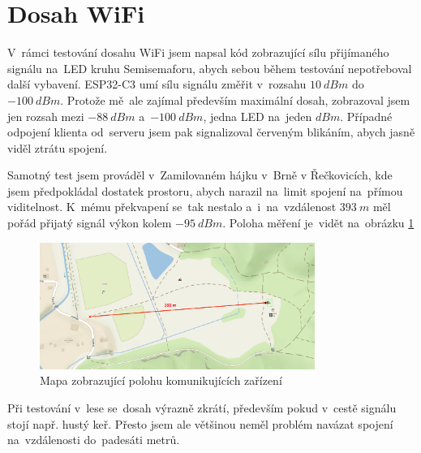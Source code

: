 \newpage
\section{Dosah WiFi}
V~rámci testování dosahu WiFi jsem napsal kód zobrazující sílu přijímaného signálu na~LED kruhu Semisemaforu, abych sebou během testování nepotřeboval další vybavení.
ESP32-C3 umí sílu signálu změřit v~rozsahu \(10~dBm\) do~\(-100~dBm\).
Protože mě~ale zajímal především maximální dosah, zobrazoval jsem jen rozsah mezi \(-88~dBm\) a~\(-100~dBm\), jedna LED na~jeden \(dBm\).
Případné odpojení klienta od~serveru jsem pak signalizoval červeným blikáním, abych jasně viděl ztrátu spojení.

Samotný test jsem prováděl v~Zamilovaném hájku v~Brně v Řečkovicích, kde jsem předpokládal dostatek prostoru, abych narazil na~limit spojení na~přímou viditelnost.
K~mému překvapení se~tak nestalo a~i~na~vzdálenost \(393~m\) měl pořád přijatý signál výkon kolem \(-95~dBm\).
Poloha měření je~vidět na~obrázku \ref{Semisemafor-dosah-zamilec}

\begin{figure}[!h]
  \centering
  \includegraphics[width=0.8\textwidth]{text/PraktickaCast/img/mapa-zamilec-semafor.png}
  \caption{Mapa zobrazující polohu komunikujících zařízení \cite{MereniDosahuSemaforu-zamilec}}
  \label{Semisemafor-dosah-zamilec}
\end{figure}

Při testování v~lese se~dosah výrazně zkrátí, především pokud v~cestě signálu stojí např. hustý keř.
Přesto jsem ale většinou neměl problém navázat spojení na~vzdálenosti do~padesáti metrů.
